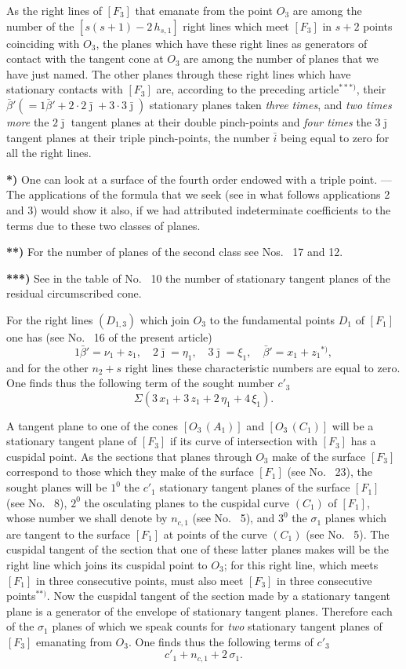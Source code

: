 \documentclass{article}
\begin{document}
As the right lines of $[F_3]$ that emanate from the point $O_3$ are among the number of the $[s(s + 1) - 2\,h_{s, 1}]$ right lines which meet $[F_3]$ in $s + 2$ points coinciding with $O_3$, the planes which have these right lines as generators of contact with the tangent cone at $O_3$ are among the number of planes that we have just named. The other planes through these right lines which have stationary contacts with $[F_3]$ are, according to the preceding article${}^{***)}$, their $\bar{\beta}' (= 1\bar{\beta}' + 2\cdot 2\bar{\jmath} + 3\cdot 3\bar{\jmath})$ stationary planes taken \emph{three times}, and \emph{two times more} the $2\bar{\jmath}$ tangent planes at their double pinch-points and \emph{four times} the $3\bar{\jmath}$ tangent planes at their triple pinch-points, the number $\bar{i}$ being equal to zero for all the right lines.

\textbf{*)} One can look at a surface of the fourth order endowed with a triple point. --- The applications of the formula that we seek (see in what follows applications 2 and 3) would show it also, if we had attributed indeterminate coefficients to the terms due to these two classes of planes.

\textbf{**)} For the number of planes of the second class see Nos.~ 17 and 12.

\textbf{***)} See in the table of No.~ 10 the number of stationary tangent planes of the residual circumscribed cone.

For the right lines $(D_{1, 3})$ which join $O_3$ to the fundamental points $D_1$ of $[F_1]$ one has (see No.~ 16 of the present article)
\[
1\bar{\beta}' = \nu_1 + z_1, \quad 2\bar{\jmath} = \eta_1, \quad 3\bar{\jmath} = \xi_1, \quad \bar{\beta}' = x_1 + z_1{}^{*)},
\]
and for the other $n_2 + s$ right lines these characteristic numbers are equal to zero. One finds thus the following term of the sought number $c'_3$
\[
\Sigma(3\,x_1 + 3\,z_1 + 2\,\eta_1 + 4\,\xi_1).
\]

A tangent plane to one of the cones $[O_3\,(A_1)]$ and $[O_3\,(C_1)]$ will be a stationary tangent plane of $[F_3]$ if its curve of intersection with $[F_3]$ has a cuspidal point. As the sections that planes through $O_3$ make of the surface $[F_3]$ correspond to those which they make of the surface $[F_1]$ (see No.~ 23), the sought planes will be $1^0$ the $c'_1$ stationary tangent planes of the surface $[F_1]$ (see No.~ 8), $2^0$ the osculating planes to the cuspidal curve $(C_1)$ of $[F_1]$, whose number we shall denote by $n_{c, 1}$ (see No.~ 5), and $3^0$ the $\sigma_1$ planes which are tangent to the surface $[F_1]$ at points of the curve $(C_1)$ (see No.~ 5). The cuspidal tangent of the section that one of these latter planes makes will be the right line which joins its cuspidal point to $O_3$; for this right line, which meets $[F_1]$ in three consecutive points, must also meet $[F_3]$ in three consecutive points${}^{**)}$. Now the cuspidal tangent of the section made by a stationary tangent plane is a generator of the envelope of stationary tangent planes. Therefore each of the $\sigma_1$ planes of which we speak counts for \emph{two} stationary tangent planes of $[F_3]$ emanating from $O_3$. One finds thus the following terms of $c'_3$
\[
c'_1 + n_{c, 1} + 2\,\sigma_1.
\]
\end{document}

